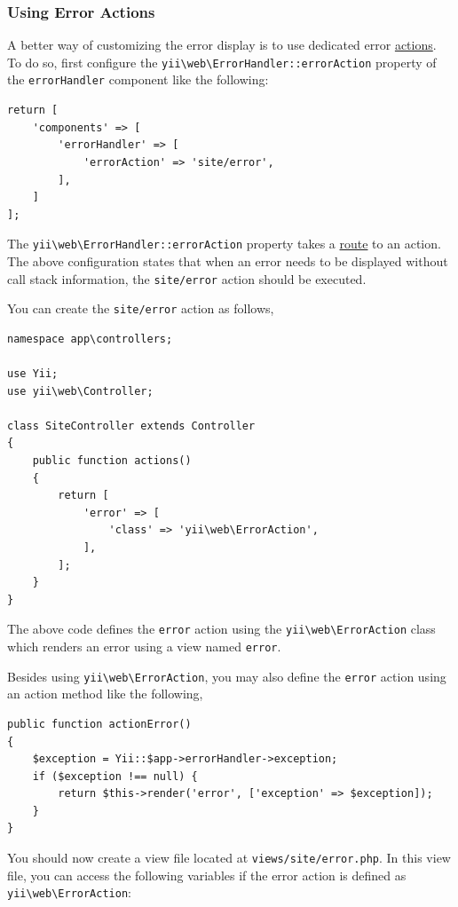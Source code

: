 \subsubsection{Using Error Actions \label{runtime-handling-errors.md::using-error-actions}}
A better way of customizing the error display is to use dedicated error \hyperref[structure-controllers.md]{actions}.
To do so, first configure the \texttt{yii{\allowbreak{}\textbackslash}web{\allowbreak{}\textbackslash}ErrorHandler\allowbreak{}::\allowbreak{}errorAction} property of the \lstinline|errorHandler|
component like the following:

\lstset{language=php}\begin{lstlisting}
return [
    'components' => [
        'errorHandler' => [
            'errorAction' => 'site/error',
        ],
    ]
];
\end{lstlisting}
The \texttt{yii{\allowbreak{}\textbackslash}web{\allowbreak{}\textbackslash}ErrorHandler\allowbreak{}::\allowbreak{}errorAction} property takes a \hyperref[structure-controllers.md::routes]{route}
to an action. The above configuration states that when an error needs to be displayed without call stack information,
the \lstinline|site/error| action should be executed.

You can create the \lstinline|site/error| action as follows,

\lstset{language=php}\begin{lstlisting}
namespace app\controllers;

use Yii;
use yii\web\Controller;

class SiteController extends Controller
{
    public function actions()
    {
        return [
            'error' => [
                'class' => 'yii\web\ErrorAction',
            ],
        ];
    }
}
\end{lstlisting}
The above code defines the \lstinline|error| action using the \texttt{yii{\allowbreak{}\textbackslash}web{\allowbreak{}\textbackslash}ErrorAction} class which renders an error
using a view named \lstinline|error|.

Besides using \texttt{yii{\allowbreak{}\textbackslash}web{\allowbreak{}\textbackslash}ErrorAction}, you may also define the \lstinline|error| action using an action method like the following,

\lstset{language=php}\begin{lstlisting}
public function actionError()
{
    $exception = Yii::$app->errorHandler->exception;
    if ($exception !== null) {
        return $this->render('error', ['exception' => $exception]);
    }
}
\end{lstlisting}
You should now create a view file located at \lstinline|views/site/error.php|. In this view file, you can access
the following variables if the error action is defined as \texttt{yii{\allowbreak{}\textbackslash}web{\allowbreak{}\textbackslash}ErrorAction}:

